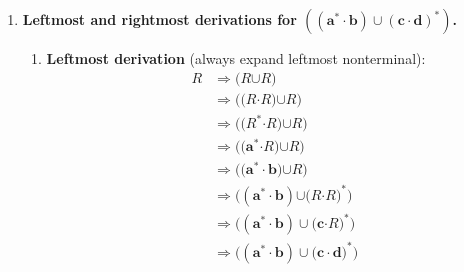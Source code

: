 \begin{enumerate}[{9.}1. ]
\begin{enumerate}
\item Grammar that strips outermost parentheses:
\[
S \to R \mid R\pmb{\cdot}R \mid R\pmb{\cup}R
\]
where $R$ is the original grammar from Example~9.3:
\[
R \to \pmb{a}\mid\pmb{b}\mid\pmb{c}\mid\pmb{\epsilon}\mid\pmb{\emptyset}\mid
\pmb{(}R\pmb{\cdot}R\pmb{)}\mid\pmb{(}R\pmb{\cup}R\pmb{)}\mid R^{\pmb{*}}.
\]
The new start symbol $S$ therefore generates all old words, and in addition it
allows the outermost parentheses of a binary expression to be omitted.

\item Grammar allowing extraneous parentheses:
\[
A \to \pmb{(}A\pmb{)} \mid \pmb{a}\mid\pmb{b}\mid\pmb{c}\mid\pmb{\epsilon}\mid
\pmb{\emptyset}\mid \pmb{(}A\pmb{\cdot}A\pmb{)}\mid
\pmb{(}A\pmb{\cup}A\pmb{)}\mid A^{\pmb{*}}.
\]
The rule $A \to \pmb{(}A\pmb{)}$ allows any expression to be wrapped in an
extra pair of parentheses, and repeated use of that rule gives arbitrarily many
extraneous pairs.
\end{enumerate}

\item \textbf{Leftmost and rightmost derivations for $\pmb{((a^*\cdot b)\cup(c\cdot d)^*)}$.}

\begin{enumerate}
\item \textbf{Leftmost derivation} (always expand leftmost nonterminal):
\begin{align*}
R &\Rightarrow \pmb{(}R\pmb{\cup}R\pmb{)} \\
&\Rightarrow \pmb{(}\pmb{(}R\pmb{\cdot}R\pmb{)}\pmb{\cup}R\pmb{)} \\
&\Rightarrow \pmb{((}R^{\pmb{*}}\pmb{\cdot}R\pmb{)}\pmb{\cup}R\pmb{)} \\
&\Rightarrow \pmb{((}\pmb{a}^{\pmb{*}}\pmb{\cdot}R\pmb{)}\pmb{\cup}R\pmb{)} \\
&\Rightarrow \pmb{((a^*\cdot}\pmb{b}\pmb{)}\pmb{\cup}R\pmb{)} \\
&\Rightarrow \pmb{((a^*\cdot b)}\pmb{\cup}\pmb{(}R\pmb{\cdot}R\pmb{)}^{\pmb{*}}\pmb{)} \\
&\Rightarrow \pmb{((a^*\cdot b)\cup(}\pmb{c}\pmb{\cdot}R\pmb{)}^{\pmb{*}}\pmb{)} \\
&\Rightarrow \pmb{((a^*\cdot b)\cup(c\cdot}\pmb{d}\pmb{)}^{\pmb{*}}\pmb{)}
\end{align*}


\end{enumerate}
\end{enumerate}
